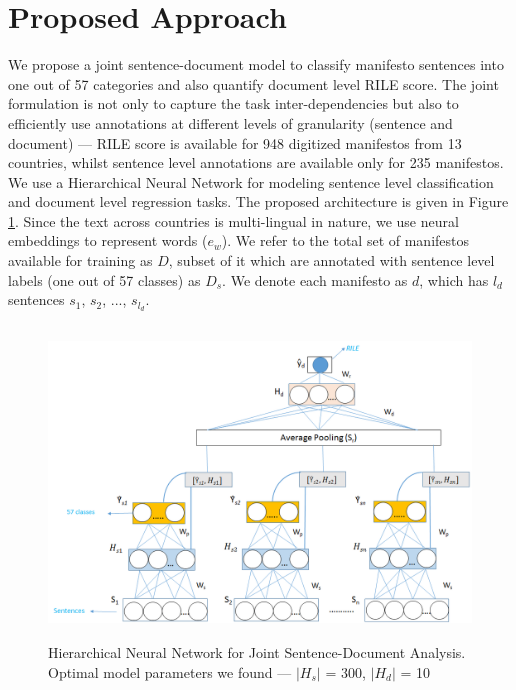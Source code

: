 \documentclass[11pt,a4paper]{article}
\newcommand{\norm}[1]{\vert #1 \vert}
\begin{document}
\section{Proposed Approach}
We propose a joint sentence-document model to classify manifesto sentences into one out of 57 categories and also quantify document level RILE score. The joint formulation is not only to capture the task inter-dependencies but also to efficiently use annotations at different levels of granularity (sentence and document) --- RILE score is available for 948 digitized manifestos from 13 countries, whilst sentence level annotations are available only for 235 manifestos. We use a Hierarchical Neural Network for modeling sentence level classification and document level regression tasks. The proposed architecture is given in Figure \ref{fig:HNN}. Since the text across countries is multi-lingual in nature, we use neural embeddings to represent words ($e_{w}$). We refer to the total set of manifestos available for training as $D$, subset of it which are annotated with sentence level labels (one out of 57 classes) as $D_{s}$. We denote each manifesto as $d$, which has $l_{d}$ sentences $s_{1}$, $s_{2}$, ..., $s_{l_{d}}$. 


\begin{figure}[!ht]
\centering
\includegraphics[height=8.3cm, scale=1.3]{Joint_Model_N9.png}
\caption{Hierarchical Neural Network for Joint Sentence-Document Analysis. Optimal model parameters we found --- $\norm{H_{s}}$ = 300, $\norm{H_{d}}$ = 10}
 \label{fig:HNN}
 \end{figure}
\end{document}
